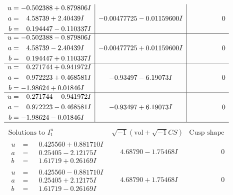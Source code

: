\documentclass[1p]{elsarticle_modified}
\theoremstyle{definition}
\newcommand{\I}{\sqrt{-1}}
\begin{document}
$$\begin{array}{c|c|c}
\begin{aligned}
u &= -0.502388 + 0.879806 I \\
a &= \phantom{-}4.58739 + 2.40439 I \\
b &= \phantom{-}0.194447 - 0.110337 I\end{aligned}
 & -0.00477725 - 0.01159600 I & \phantom{-0.000000 } 0 \\ \hline\begin{aligned}
u &= -0.502388 - 0.879806 I \\
a &= \phantom{-}4.58739 - 2.40439 I \\
b &= \phantom{-}0.194447 + 0.110337 I\end{aligned}
 & -0.00477725 + 0.01159600 I & \phantom{-0.000000 } 0 \\ \hline\begin{aligned}
u &= \phantom{-}0.271744 + 0.941972 I \\
a &= \phantom{-}0.972223 + 0.468581 I \\
b &= -1.98624 + 0.01846 I\end{aligned}
 & -0.93497 - 6.19073 I & \phantom{-0.000000 } 0 \\ \hline\begin{aligned}
u &= \phantom{-}0.271744 - 0.941972 I \\
a &= \phantom{-}0.972223 - 0.468581 I \\
b &= -1.98624 - 0.01846 I\end{aligned}
 & -0.93497 + 6.19073 I & \phantom{-0.000000 } 0\\
 \hline 
 \end{array}$$\newpage$$\begin{array}{c|c|c}  
\text{Solutions to }I^u_{1}& \I (\text{vol} + \sqrt{-1}CS) & \text{Cusp shape}\\
 \hline 
\begin{aligned}
u &= \phantom{-}0.425560 + 0.881710 I \\
a &= \phantom{-}0.25405 - 2.12175 I \\
b &= \phantom{-}1.61719 + 0.26169 I\end{aligned}
 & \phantom{-}4.68790 - 1.75468 I & \phantom{-0.000000 } 0 \\ \hline\begin{aligned}
u &= \phantom{-}0.425560 - 0.881710 I \\
a &= \phantom{-}0.25405 + 2.12175 I \\
b &= \phantom{-}1.61719 - 0.26169 I\end{aligned}
 & \phantom{-}4.68790 + 1.75468 I & \phantom{-0.000000 } 0 \\ \hline\begin{aligned}

\end{aligned}
\end{array}$$
\end{document}
